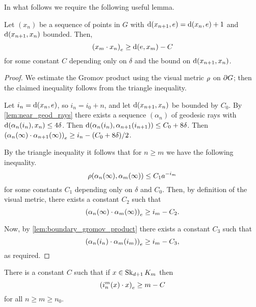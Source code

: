 \documentclass[a4paper]{article}
\begin{document}
In what follows we require the following useful lemma.

\begin{lemma}\label{lem:useful}
  Let $(x_n)$ be a sequence of points in $G$ with $\dist(x_{n+1}, e) = 
  \dist(x_n, e) + 1$ and $\dist(x_{n+1}, x_n)$ bounded. Then,
  \begin{equation*}
    \gromov{e}{x_m}{x_n} \geq \dist(e,x_m) - C
  \end{equation*}
  for some constant $C$ depending only on $\delta$ and the bound on 
  $\dist(x_{n+1}, x_n)$.
\end{lemma}

\begin{proof}
  We estimate the Gromov product using the visual metric $\vdistance$ on 
  $\boundary G$; then the claimed inequality follows from the triangle 
  inequality. 
  
  Let $i_n = \dist(x_n, e)$, so $i_n = i_0 + n$, and let 
  $\dist(x_{n+1},x_n)$ be bounded by $C_0$. By 
  \cref{lem:near_geod_rays} there exists a sequence $(\alpha_n)$ of 
  geodesic rays with $\dist(\alpha_n(i_n), x_n) \leq 4\delta$. Then 
  $\dist(\alpha_n(i_n), \alpha_{n+1}(i_{n+1})) \leq C_0 + 8\delta$. Then 
  $\gromov{e}{\alpha_n(\infty)}{ \alpha_{n+1}(\infty)} \geq i_n - (C_0 + 
  8\delta)/2$.

  By the triangle inequality it follows that for $n\geq m$ we have the following 
  inequality.
  \begin{equation*}
    \vdistance(\alpha_n(\infty), \alpha_m(\infty)) \leq C_1 a^{-i_m}
  \end{equation*}
  for some constants $C_1$ depending only on $\delta$ and $C_0$. Then, by
  definition of the visual metric, there exists a constant $C_2$ such that
  \begin{equation*}
    \gromov{e}{\alpha_n(\infty)}{\alpha_m(\infty)} \geq i_m - C_2.
  \end{equation*}

  Now, by \cref{lem:boundary_gromov_product} there exists a constant $C_3$ such
  that
  \begin{equation*}
    \gromov{e}{\alpha_n(i_n)}{\alpha_m(i_m)} \geq i_m - C_3,
  \end{equation*}
  as required.
\end{proof}

\begin{lemma}\label{lem:linearproduct}
  There is a constant $C$ such that if $x \in \Skel_{d+1} K_m$ then
  \begin{equation*}
    \gromov{e}{i^m_n(x)}{x} \geq m - C
  \end{equation*}
  for all $n\geq m\geq n_0$.
\end{lemma}
\end{document}
